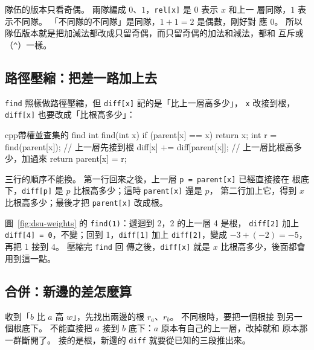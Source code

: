 隊伍的版本只看奇偶。 兩隊編成 $0$、$1$，\texttt{rel[x]} 是 $0$ 表示 $x$ 和上一
層同隊，$1$ 表示不同隊。 「不同隊的不同隊」是同隊，$1 + 1 = 2$ 是偶數，剛好對
應 $0$。 所以隊伍版本就是把加減法都改成只留奇偶，而只留奇偶的加法和減法，都和
互斥或（\texttt{\^}）一樣。

\subsection{路徑壓縮：把差一路加上去}

\texttt{find} 照樣做路徑壓縮，但 \texttt{diff[x]} 記的是「比上一層高多少」，
\texttt{x} 改接到根，\texttt{diff[x]} 也要改成「比根高多少」：

\begin{code}{cpp}{帶權並查集的 find}
int find(int x) {
    if (parent[x] == x) {
        return x;
    }
    int r = find(parent[x]);    // 上一層先接到根
    diff[x] += diff[parent[x]]; // 上一層比根高多少，加過來
    return parent[x] = r;
}
\end{code}

三行的順序不能換。 第一行回來之後，上一層 \texttt{p = parent[x]} 已經直接接在
根底下，\texttt{diff[p]} 是 $p$ 比根高多少；這時 \texttt{parent[x]} 還是 $p$，
第二行加上它，得到 $x$ 比根高多少；最後才把 \texttt{parent[x]} 改成根。

圖~\ref{fig:dsu-weights} 的 \texttt{find(1)}：遞迴到 2，2 的上一層 4 是根，
\texttt{diff[2]} 加上 \texttt{diff[4] = 0}，不變；回到 1，\texttt{diff[1]} 加上
\texttt{diff[2]}，變成 $-3 + (-2) = -5$，再把 1 接到 4。 壓縮完 \texttt{find} 回
傳之後，\texttt{diff[x]} 就是 $x$ 比根高多少，後面都會用到這一點。

\subsection{合併：新邊的差怎麼算}

收到「$b$ 比 $a$ 高 $w$」，先找出兩邊的根 $r_a$、$r_b$。 不同根時，要把一個根接
到另一個根底下。 不能直接把 $a$ 接到 $b$ 底下：$a$ 原本有自己的上一層，改掉就和
原本那一群斷開了。 接的是根，新邊的 \texttt{diff} 就要從已知的三段推出來。

\begin{center}
\label{fig:dsu-merge}
\end{center}

